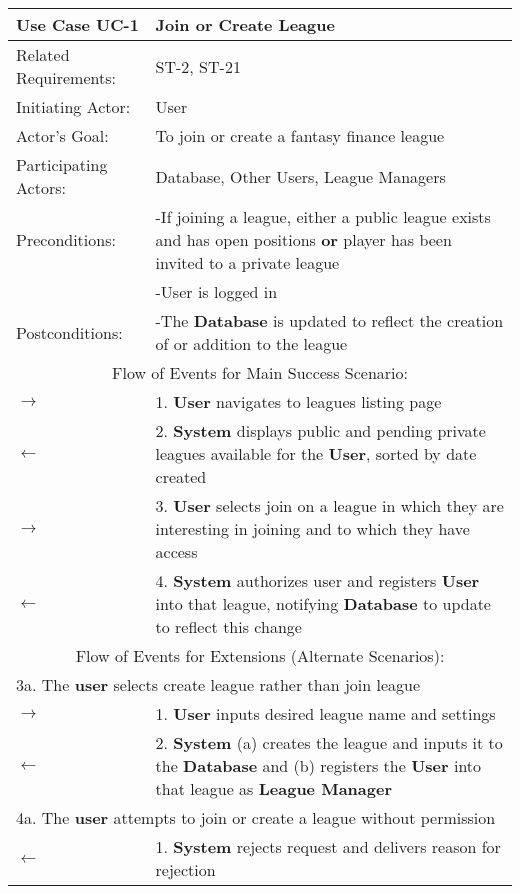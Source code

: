 \begin{centering}
\renewcommand\arraystretch{1.3} %
\label{UC-1}
\begin{longtable}{|p{1.2in} p{5in}|}

\hline
\bfseries{\color{color1}Use Case UC-1} & \bfseries{\color{color1}Join or Create League} \\
\hline
Related Requirements: & ST-2, ST-21 \\ 
Initiating Actor:     & User \\
Actor's Goal:         & To join or create a fantasy finance league \\
Participating Actors:  & Database, Other Users, League Managers\\
Preconditions:        & -If joining a league, either a public league exists and has open positions \textbf{or} player has been invited to a private league\\
 & -User is logged in \\
Postconditions:       & -The \textbf{Database} is updated to reflect the creation of or addition to the league \\
\hline
\multicolumn{2}{|c|}{\color{color1}Flow of Events for Main Success Scenario:}\\
\hline
$\rightarrow$ & 1. \textbf{User} navigates to leagues listing page \\
$\leftarrow$ & 2. \textbf{System} displays public and pending private leagues available for the \textbf{User}, sorted by date created \\
$\rightarrow$ & 3. \textbf{User} selects join on a league in which they are interesting in joining and to which they have access \\
$\leftarrow$ & 4. \textbf{System} authorizes user and registers \textbf{User} into that league, notifying \textbf{Database} to update to reflect this change \\
\hline
\multicolumn{2}{|c|}{\color{color1}Flow of Events for Extensions (Alternate Scenarios):} \\
\hline
\multicolumn{2}{|p{6.2in}|}{3a. The \textbf{user} selects create league rather than join league} \\
\hline
$\rightarrow$ & 1.  \textbf{User} inputs desired league name and settings \\
$\leftarrow$ & 2. \textbf{System} (a) creates the league and inputs it to the \textbf{Database} and (b) registers the \textbf{User} into that league as \textbf{League Manager} \\
\hline
\multicolumn{2}{|p{6.2in}|}{4a. The \textbf{user} attempts to join or create a league without permission} \\
\hline
$\leftarrow$ & 1.  \textbf{System} rejects request and delivers reason for rejection \\
\hline
\end{longtable}
\end{centering}

